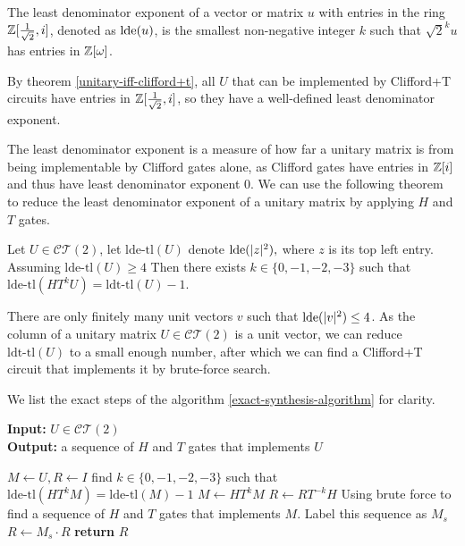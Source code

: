 \begin{definition}\label{def:lde}
	The least denominator exponent of a vector or matrix $u$ with entries in the ring $\mathbb{Z}[\frac{1}{\sqrt{2}}, i]$, denoted as $\text{lde}(u)$, is the smallest non-negative integer $k$ such that $\sqrt{2}^k u$ has entries in $\mathbb{Z}[\omega]$.
\end{definition}

By theorem \ref{unitary-iff-clifford+t}, all $U$ that can be implemented by Clifford+T circuits have entries in $\mathbb{Z}[\frac{1}{\sqrt{2}}, i]$, so they have a well-defined least denominator exponent.

The least denominator exponent is a measure of how far a unitary matrix is from being implementable by Clifford gates alone, as Clifford gates have entries in $\mathbb{Z}[i]$ and thus have least denominator exponent $0$.
We can use the following theorem to reduce the least denominator exponent of a unitary matrix by applying $H$ and $T$ gates.

\begin{theorem}\label{lde-reduction}
	Let $U \in \mathcal{CT}(2)$,
	let $\text{lde-tl}(U)$ denote $\text{lde}(|z|^2),$ where $z$ is its top left entry.
	Assuming $\text{lde-tl}(U) \geq 4$
	Then there exists $k \in \{0, -1, -2, -3\}$ such that $\text{lde-tl}(H T^k U) = \text{ldt-tl}(U) - 1$.
\end{theorem}

There are only finitely many unit vectors $v$ such that $\text{lde}(|v|^2) \leq 4$.
As the column of a unitary matrix $U \in \mathcal{CT}(2)$ is a unit vector, we can reduce $\text{ldt-tl}(U)$ to a small enough number, after which we can find a Clifford+T circuit that implements it by brute-force search.

We list the exact steps of the algorithm \ref{exact-synthesis-algorithm} for clarity.

\begin{algorithm}[ht]\label{exact-synthesis-algorithm}
	\caption{Exact Synthesis of Single Qubit Unitaries over Clifford+T}
	\hspace*{\algorithmicindent} \textbf{Input:} $U \in \mathcal{CT}(2)$ \\
\hspace*{\algorithmicindent} \textbf{Output:} a sequence of $H$ and $T$ gates that implements $U$
\begin{algorithmic}[1]
	\State $M \gets U, R \gets I$ 
	 \label{while-loop-exact-synthesis}
	\State find $k \in \{0, -1, -2, -3\}$ such that $\text{lde-tl}(H T^k M) = \text{lde-tl}(M) - 1$ 
\State $M \gets H T^k M$ 
\State $R \gets R T^{-k} H$
\EndWhile 
\State Using brute force to find a sequence of $H$ and $T$ gates that implements $M$. Label this sequence as $M_s$
\State $R \gets M_s \cdot R$
\State \textbf{return} $R$
\end{algorithmic}
\end{algorithm}

